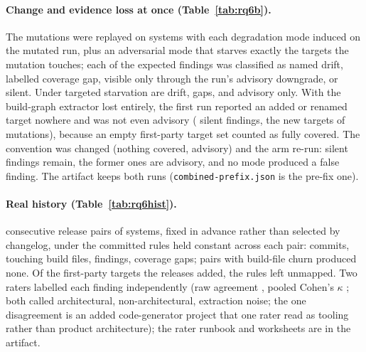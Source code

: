 \documentclass[10pt,conference]{IEEEtran}
\begin{document}
\paragraph{Change and evidence loss at once (Table~\ref{tab:rq6b}).} The \rqSixCombMutations{}
mutations were replayed on \rqSixCombSystems{} systems with each degradation mode induced on the
mutated run, plus an adversarial mode that starves exactly the targets the mutation touches; each
of the \rqSixCombFindings{} expected findings was classified as named drift, labelled coverage gap,
visible only through the run's advisory downgrade, or silent. Under targeted starvation
\rqSixCombStarveMutatedDrift{} are drift, \rqSixCombStarveMutatedGap{} gaps, and
\rqSixCombStarveMutatedAdvisory{} advisory only. With the build-graph extractor lost entirely, the
first run reported an added or renamed target nowhere and was not even advisory
(\rqSixCombPrefixSilentTotal{} silent findings, the new targets of
\texttt{\rqSixCombPrefixSilentOps{}} mutations), because an empty first-party target set counted as
fully covered. The convention was changed (nothing covered, advisory) and the arm re-run:
\rqSixCombSilentTotal{} silent findings remain, the \rqSixCombLoseLZeroAdvisory{} former ones are
advisory, and no mode produced a false finding. The artifact keeps both runs
(\texttt{combined-prefix.json} is the pre-fix one).

\paragraph{Real history (Table~\ref{tab:rq6hist}).} \rqSixHistPairs{} consecutive release pairs of
\rqSixHistSystems{} systems, fixed in advance rather than selected by changelog, under the
committed rules held constant across each pair: \rqSixHistCommits{} commits,
\rqSixHistBuildCommits{} touching build files, \rqSixHistFindings{} findings,
\rqSixHistCoverageGaps{} coverage gaps; \rqSixHistPairsZero{} pairs with build-file churn produced
none. Of the \rqSixHistNewTargets{} first-party targets the releases added, the rules left
\rqSixHistNewUnmapped{} unmapped. Two raters labelled each finding independently (raw
agreement \rqSixHistLabelsAgree{}, pooled Cohen's $\kappa$ \rqSixHistLabelsKappa{}; both called
\rqSixHistArchitectural{} architectural, \rqSixHistNonArchitectural{} non-architectural,
\rqSixHistNoise{} extraction noise; the one disagreement is an added code-generator project
that one rater read as tooling rather than product architecture); the rater runbook and
worksheets are in the artifact.
\end{document}
